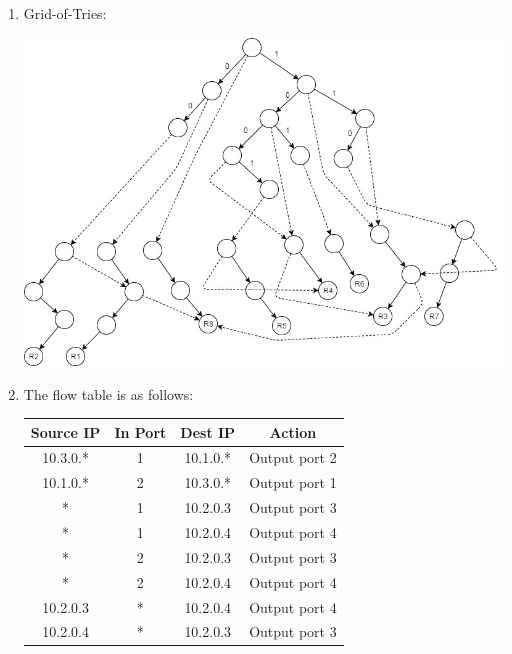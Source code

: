 \documentclass{article}
\begin{document}
\begin{enumerate}
\begin{enumerate}
\end{enumerate}


\item Grid-of-Tries: 


    \includegraphics[width=\textwidth]{assignment4_gridoftries}


\item The flow table is as follows:

\begin{tabular}{|c|c|c|c|}
    \hline
    Source IP & In Port & Dest IP & Action \\ \hline
    10.3.0.* & 1 & 10.1.0.* & Output port 2 \\ \hline
    10.1.0.* & 2 & 10.3.0.* & Output port 1 \\ \hline
    * & 1 & 10.2.0.3 & Output port 3 \\ \hline
    * & 1 & 10.2.0.4 & Output port 4 \\ \hline
    * & 2 & 10.2.0.3 & Output port 3 \\ \hline
    * & 2 & 10.2.0.4 & Output port 4 \\ \hline
    10.2.0.3 & * & 10.2.0.4 & Output port 4 \\ \hline
    10.2.0.4 & * & 10.2.0.3 & Output port 3 \\ \hline
\end{tabular}

\end{enumerate}
\end{document}
